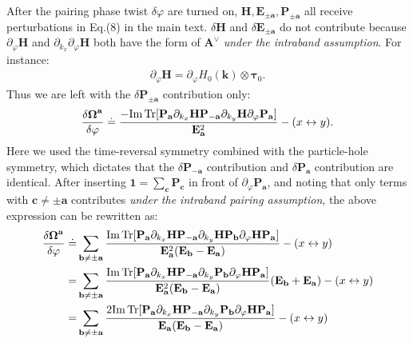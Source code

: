 \begin{subappendices}
After the pairing phase twist $\delta \varphi$ are turned on, $\mathbf H, \mathbf E_{\pm\mathbf a}, \mathbf P_{\pm \mathbf a}$ all receive perturbations in Eq.(8) in the main text. $\delta\mathbf H$ and $\delta\mathbf E_{\pm\mathbf a}$ do not contribute because $\partial_\varphi\mathbf H$ and $\partial_{k_x}\partial_\varphi\mathbf H$ both have the form of $\mathbf A^\vee$ \emph{under the intraband assumption}. For instance:
\begin{align}
	\partial_\varphi \mathbf H=\partial_\varphi H_0(\bm{k})\otimes\boldsymbol\tau_0\label{eq:partial_varphi}.
\end{align}
Thus we are left with the $\delta \mathbf P_{\pm \mathbf a}$ contribution only:
\begin{align}
\frac{\delta \boldsymbol \Omega ^{\mathbf a}}{\delta \varphi}\doteq \frac{- \mbox{Im\,Tr}[\mathbf P_{\mathbf a} \partial_{k_x} \mathbf H \mathbf P_{-\mathbf a} \partial_{k_y}\mathbf H \partial_\varphi\mathbf P_{\mathbf a}]}{\mathbf E_{\mathbf a}^2}-(x\leftrightarrow y).
\end{align}
Here we used the time-reversal symmetry combined with the particle-hole symmetry, which dictates that the $\delta \mathbf P_{-\mathbf a}$ contribution and $\delta \mathbf P_{\mathbf a}$ contribution are identical. After inserting $\mathbf 1=\sum_{\mathbf c} \mathbf{P}_{\mathbf c}$ in front of $\partial_\varphi \mathbf P_{\mathbf a}$, and noting that only terms with $\mathbf c\neq \pm \mathbf a$ contributes \emph{under the intraband pairing assumption}, the above expression can be rewritten as:
\begin{align}
	\frac{\delta \boldsymbol \Omega ^{\mathbf a}}{\delta \varphi}\doteq &\sum_{\mathbf b\neq \pm\mathbf a}\frac{\mbox{Im\,Tr}[\mathbf P_{\mathbf a} \partial_{k_x} \mathbf H \mathbf P_{-\mathbf a} \partial_{k_y}\mathbf H \mathbf P_{\mathbf b}\partial_\varphi\mathbf H \mathbf P_{\mathbf a}]}{\mathbf E_{\mathbf a}^2(\mathbf E_{\mathbf b}-\mathbf E_{\mathbf a})}-(x\leftrightarrow y)\notag\\
	=&\sum_{\mathbf b\neq \pm\mathbf a}\frac{ \mbox{Im\,Tr}[\mathbf P_{\mathbf a} \partial_{k_x} \mathbf H \mathbf P_{-\mathbf a} \partial_{k_y}\mathbf P_{\mathbf b}\partial_\varphi\mathbf H \mathbf P_{\mathbf a}]}{\mathbf E_{\mathbf a}^2(\mathbf E_{\mathbf b}-\mathbf E_{\mathbf a})}(\mathbf E_{\mathbf b}+\mathbf E_{\mathbf a})-(x\leftrightarrow y)\notag\\
	=&\sum_{\mathbf b\neq \pm\mathbf a}\frac{2 \mbox{Im\,Tr}[\mathbf P_{\mathbf a} \partial_{k_x} \mathbf H \mathbf P_{-\mathbf a} \partial_{k_y}\mathbf P_{\mathbf b}\partial_\varphi\mathbf H \mathbf P_{\mathbf a}]}{\mathbf E_{\mathbf a}(\mathbf E_{\mathbf b}-\mathbf E_{\mathbf a})}-(x\leftrightarrow y)\notag\\

\end{align}
\end{subappendices}
